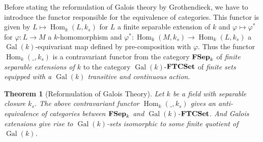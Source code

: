 \documentclass{article}
\theoremstyle{plain}
\newtheorem{theorem}{Theorem}[subsection]
\theoremstyle{definition}
\DeclareMathOperator{\Hom}{Hom}
\DeclareMathOperator{\Gal}{Gal}
\DeclareMathOperator{\FSep}{\bf{FSep}}
\DeclareMathOperator{\FTCSet}{\bf{FTCSet}}
\begin{document}
\noindent Before stating the reformulation of Galois theory by Grothendieck, we have to introduce the functor responsible for the equivalence of categories. 
This functor is given by $L \mapsto \Hom_k(L,k_s)$ for $L$ a finite separable extension of $k$ and $\varphi \mapsto \varphi^*$ for $\varphi:L\rightarrow M$ a $k$-homomorphism and $\varphi^* :\Hom_k(M,k_s)\rightarrow\Hom_k(L,k_s)$ a $\Gal(k)$-equivariant map defined by pre-composition with $\varphi$.
Thus the functor $\Hom_k(\_,k_s)$ is a contravariant functor from the category $\FSep_k$ of \textit{finite separable extensions of $k$} to the category $\Gal(k)$-$\FTCSet$ of \textit{finite sets equipped with a $\Gal(k)$ transitive and continuous action}.



\begin{theorem}[Reformulation of Galois Theory]
\label{Grot_reformulation_Galois}
    Let $k$ be a field with separable closure $k_s$. 
    The above contravariant functor $\Hom_k(\_,k_s)$
    gives an anti-equivalence of categories between $\FSep_k$ and $\Gal(k)$-$\FTCSet$.
    And Galois extensions give rise to $\Gal(k)$-sets isomorphic to some finite quotient of $\Gal(k)$.
\end{theorem}
\end{document}
